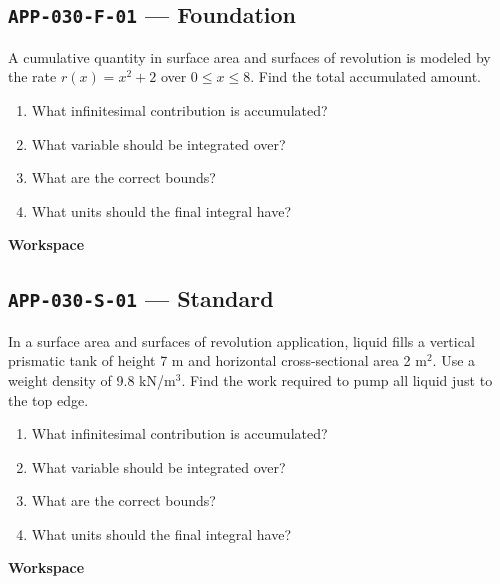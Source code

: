 \documentclass[11pt]{book}
\newcommand{\pid}[1]{\texttt{#1}}
\newcommand{\workspace}{\par\vspace{0.7in}\hrulefill\par\vspace{0.55in}\hrulefill\par}
\begin{document}
\subsection*{\pid{APP-030-F-01} — Foundation}
\begin{problembox}
A cumulative quantity in surface area and surfaces of revolution is modeled by the rate $r(x)=x^2+2$ over $0\le x\le 8$. Find the total accumulated amount.
\end{problembox}
\begin{promptbox}\begin{enumerate}
\item What infinitesimal contribution is accumulated?
\item What variable should be integrated over?
\item What are the correct bounds?
\item What units should the final integral have?
\end{enumerate}\end{promptbox}
\textbf{Workspace}\workspace
{}
\subsection*{\pid{APP-030-S-01} — Standard}
\begin{problembox}
In a surface area and surfaces of revolution application, liquid fills a vertical prismatic tank of height 7 m and horizontal cross-sectional area 2 m$^2$. Use a weight density of 9.8 kN/m$^3$. Find the work required to pump all liquid just to the top edge.
\end{problembox}
\begin{promptbox}\begin{enumerate}
\item What infinitesimal contribution is accumulated?
\item What variable should be integrated over?
\item What are the correct bounds?
\item What units should the final integral have?
\end{enumerate}\end{promptbox}
\textbf{Workspace}\workspace
{}
\end{document}
